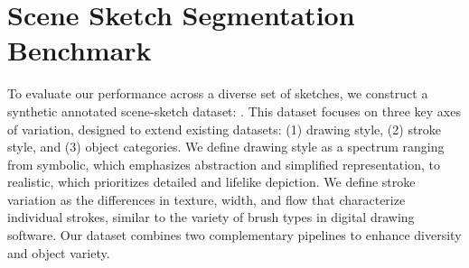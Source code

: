 \section{Scene Sketch Segmentation Benchmark}
To evaluate our performance across a diverse set of sketches, we construct a synthetic annotated scene-sketch dataset: \datasetname{}. This dataset focuses on three key axes of variation, designed to extend existing datasets: (1) drawing style, (2) stroke style, and (3) object categories. 
We define drawing style as a spectrum ranging from symbolic, which emphasizes abstraction and simplified representation, to realistic, which prioritizes detailed and lifelike depiction. We define stroke variation as the differences in texture, width, and flow that characterize individual strokes, similar to the variety of brush types in digital drawing software.
Our dataset combines two complementary pipelines to enhance diversity and object variety. 

